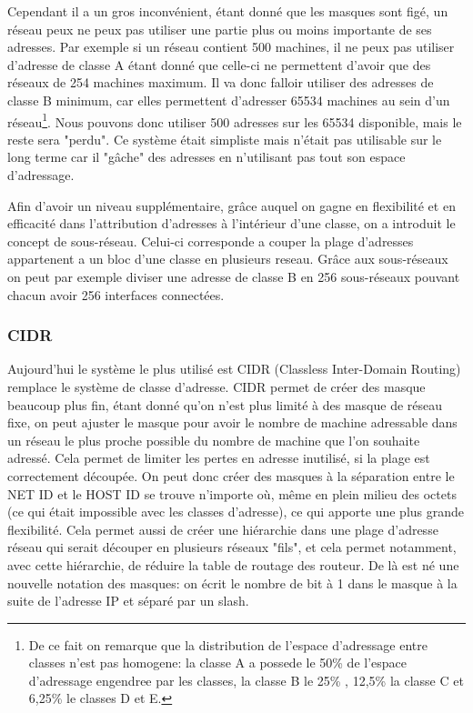 Cependant il a un gros inconvénient, étant donné que les masques sont
figé, un réseau peux ne peux pas utiliser une partie plus ou moins importante
de ses adresses. Par exemple si un réseau contient 500 machines, il ne peux pas
utiliser d'adresse de classe A étant donné que celle-ci ne permettent d'avoir
que des réseaux de 254 machines maximum. Il va donc falloir utiliser des
adresses de classe B minimum, car elles permettent d'adresser 65534 machines au
sein d'un réseau\footnote{
De ce fait on remarque que la distribution de l’espace d’adressage entre
classes n'est pas homogene: la classe A a possede le 50\% de l’espace
d'adressage engendree par les classes, la classe B le 25\% , 12,5\% la classe C et
6,25\% le classes D et E.}. Nous pouvons donc utiliser 500 adresses sur les 65534
disponible, mais le reste sera "perdu".  Ce système était simpliste mais
n'était pas utilisable sur le long terme car il "gâche" des adresses en
n'utilisant pas tout son espace d'adressage.

Afin d'avoir un niveau supplémentaire, grâce auquel on gagne en flexibilité et
en efficacité dans l'attribution d'adresses à l'intérieur d'une classe, on a
introduit le concept de sous-réseau. Celui-ci corresponde a couper la plage
d'adresses appartenent a un bloc d'une classe en plusieurs reseau. Grâce aux
sous-réseaux on peut par exemple diviser une adresse de classe B en 256
sous-réseaux pouvant chacun avoir 256 interfaces connectées. 


\subsubsection{CIDR}

Aujourd'hui le système le plus utilisé est CIDR (Classless Inter-Domain
Routing) remplace le système de classe d'adresse. CIDR permet de créer des
masque beaucoup plus fin, étant donné qu'on n'est plus limité à des masque de
réseau fixe, on peut ajuster le masque pour avoir le nombre de machine
adressable dans un réseau le plus proche possible du nombre de machine que l'on
souhaite adressé.  Cela permet de limiter les pertes en adresse inutilisé, si
la plage est correctement découpée.  On peut donc créer des masques à la
séparation entre le NET ID et le HOST ID se trouve n'importe où, même en plein
milieu des octets (ce qui était impossible avec les classes d'adresse), ce qui
apporte une plus grande flexibilité.  Cela permet aussi de créer une hiérarchie
dans une plage d'adresse réseau qui serait découper en plusieurs réseaux
"fils", et cela permet notamment, avec cette hiérarchie, de réduire la table de
routage des routeur.  De là est né une nouvelle notation des masques: on écrit
le nombre de bit à 1 dans le masque à la suite de l'adresse IP et séparé par un
slash.


